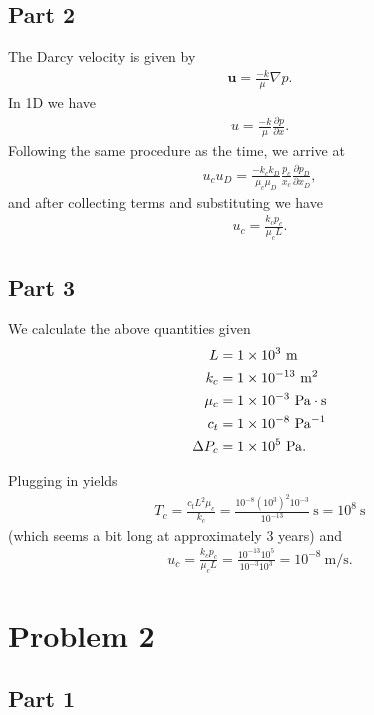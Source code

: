 \documentclass{article}
\begin{document}
\subsection{Part 2}
The Darcy velocity is given by
\begin{align}
\mathbf{u} = \frac{-k}{\mu} \nabla p.
\end{align}
In 1D we have
\begin{align}
u = \frac{-k}{\mu} \frac{\partial p}{\partial x}.
\end{align}
Following the same procedure as the time, we arrive at
\begin{align}
u_c u_D = \frac{-k_c k_D}{\mu_c \mu_D} \frac{p_c}{x_c} \frac{\partial p_D}{\partial x_D},
\end{align}
and after collecting terms and substituting we have
\begin{align}
u_c = \frac{k_c p_c}{\mu_c L}.
\end{align}

\subsection{Part 3}
We calculate the above quantities given
\begin{align}
    L &= \num{1e3}\ \si{\meter} \\
    k_c &= \num{1e-13}\ \si{\meter\squared} \\
    \mu_c &= \num{1e-3}\ \si[inter-unit-product = \ensuremath{{}\cdot{}}]{\pascal\second} \\
    c_t &= \num{1e-8}\ \si{\per\pascal} \\
    \Delta P_c &= \num{1e5}\ \si{\pascal}.
\end{align}

Plugging in yields
\begin{align}
    T_c = \frac{c_t L^2 \mu_c}{k_c} = \frac{10^{-8} (10^3)^2 10^{-3}}{10^{-13}}\ \si{\second} = 10^8\ \si{\second}
\end{align}
(which seems a bit long at approximately 3 years) and
\begin{align}
    u_c = \frac{k_c p_c}{\mu_c L} = \frac{10^{-13} 10^5}{10^{-3} 10^3} = 10^{-8}\ \si{\meter\per\second}.
\end{align}


\section{Problem 2}
\subsection{Part 1}
\end{document}
